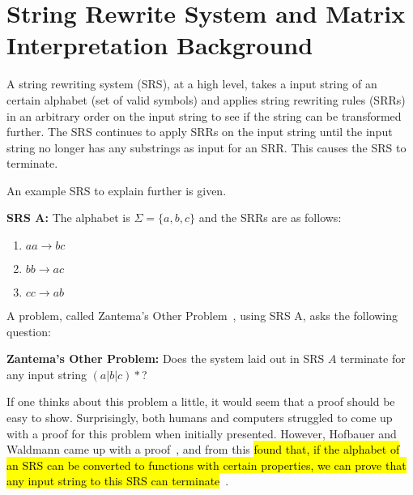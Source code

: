 \section{String Rewrite System and Matrix Interpretation Background}
A string rewriting system (SRS), at a high level, takes a input string of an certain alphabet (set of valid symbols) and applies string rewriting rules (SRRs) in an arbitrary order on the input string to see if the string can be transformed further. The SRS continues to apply SRRs on the input string until the input string no longer has any substrings as input for an SRR. This causes the SRS to terminate. \par
An example SRS to explain further is given.\par\noindent
\textbf{SRS A:} The alphabet is $\Sigma = \{a, b, c\}$ and the SRRs are as follows:
\begin{enumerate}
    \item $aa \rightarrow bc$
    \item $bb \rightarrow ac$
    \item $cc \rightarrow ab$
\end{enumerate}
A problem, called Zantema's Other Problem~\cite{Hofbauer:2006:TA:1142725.1711178}, using SRS A, asks the following question:\par\noindent
\textbf{Zantema's Other Problem:}
Does the system laid out in SRS $A$ terminate for any input string $(a|b|c)*$?\par
If one thinks about this problem a little, it would seem that a proof should be easy to show.  Surprisingly, both humans and computers struggled to come up with a proof for this problem when initially presented.  However, Hofbauer and Waldmann came up with a proof~\cite{Hofbauer:2006:TA:1142725.1711178}, and from this \hl{found that, if the alphabet of an SRS can be converted to functions with certain properties, we can prove that any input string to this SRS can terminate}~\cite{Hofbauer2006}. 

